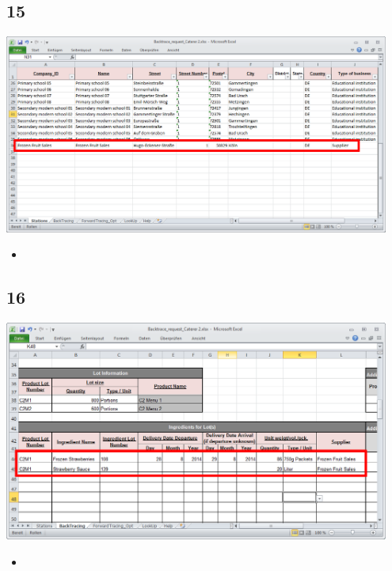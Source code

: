 \documentclass{beamer}
\begin{document}
\subsection{15}
\begin{frame}
	\begin{center}
  		\includegraphics[width=0.95\textwidth]{15.png}
	\end{center}
	\begin{itemize}
		\item
	\end{itemize}
\end{frame}

\subsection{16}
\begin{frame}
	\begin{center}
  		\includegraphics[width=0.95\textwidth]{16.png}
	\end{center}
	\begin{itemize}
		\item
	\end{itemize}
\end{frame}
\end{document}
